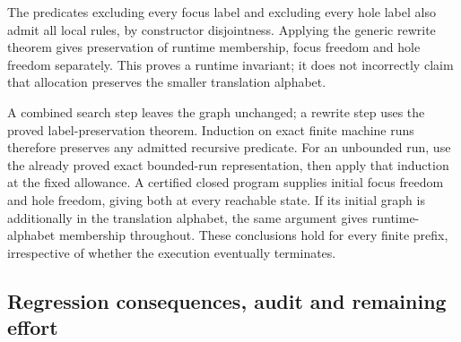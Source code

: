 The predicates excluding every focus label and excluding every hole label
also admit all local rules, by constructor disjointness. Applying the generic
rewrite theorem gives preservation of runtime membership, focus freedom and
hole freedom separately. This proves a runtime invariant; it does not
incorrectly claim that allocation preserves the smaller translation alphabet.










A combined search step leaves the graph unchanged; a rewrite step uses the
proved label-preservation theorem. Induction on exact finite machine runs
therefore preserves any admitted recursive predicate. For an unbounded run,
use the already proved exact bounded-run representation, then apply that
induction at the fixed allowance. A certified closed program supplies initial
focus freedom and hole freedom, giving both at every reachable state.
If its initial graph is additionally in the translation alphabet, the same
argument gives runtime-alphabet membership throughout. These conclusions
hold for every finite prefix, irrespective of whether the execution eventually
terminates.





\subsection{Regression consequences, audit and remaining effort}

